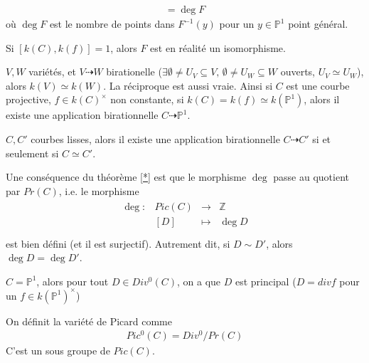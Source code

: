             \begin{theo}
                \label{***}
                \begin{align*}
                    [k(C), k(f)] = \deg F
                \end{align*}
                où $\deg F$ est le nombre de points dans $F^{-1}(y)$ pour un $y \in \mathbb{P}^1$ point général.
            \end{theo}
            \begin{remq}
                Si $[k(C),k(f)] = 1$, alors $F$ est en réalité un isomorphisme.
            \end{remq}
            \begin{remq}
                $V,W$ variétés, et $V \dashrightarrow W$ birationelle ($\exists \emptyset \neq U_V \subseteq V,\, \emptyset \neq U_W \subseteq W$ ouverts, $U_V \simeq U_W$), alors $k(V) \simeq k(W)$. La réciproque est aussi vraie. Ainsi si $C$ est une courbe projective, $f \in k(C)^\times$ non constante, si $k(C) = k(f) \simeq k(\mathbb{P}^1)$, alors il existe une application birationnelle $C \dashrightarrow \mathbb{P}^1$.
            \end{remq}
            \begin{exo}
                $C,C'$ courbes lisses, alors il existe une application birationnelle $C \dashrightarrow C'$ si et seulement si $C \simeq C'$.
            \end{exo}
            Une conséquence du théorème \ref{*} est que le morphisme $\deg$ passe au quotient par $Pr(C)$, i.e. le morphisme
            \begin{align*}
                \begin{array}{cccc}
                    \deg : & Pic(C) & \to & \mathbb{Z} \\
                    & [D] & \mapsto & \deg D\\
                \end{array}
            \end{align*}
            est bien défini (et il est surjectif). Autrement dit, si $D \sim D'$, alors $\deg D = \deg D'$.
            \begin{exo}
                $C = \mathbb{P}^1$, alors pour tout $D \in Div^0(C)$, on a que $D$ est principal ($D = div f$ pour un $f \in k(\mathbb{P}^1)^\times$)
            \end{exo}
            \begin{defi}
                On définit la variété de Picard comme
                \begin{align*}
                    Pic^0(C) = Div^0/Pr(C)
                \end{align*}
                C'est un sous groupe de $Pic(C)$.
            \end{defi}
